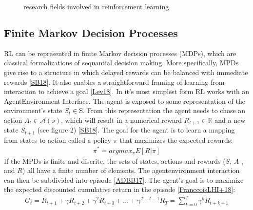 \documentclass[letterpaper,10pt,english]{jupyterBook}
\let\sphinxpxdimen\pdfpxdimen\else\newdimen\sphinxpxdimen
\begin{document}
\begin{figure}[htbp]
\centering
\capstart

\noindent\sphinxincludegraphics[width=600\sphinxpxdimen,height=250\sphinxpxdimen]{{tree}.png}
\caption{research fields involved in reinforcement learning}\label{\detokenize{Reinforcement_learning:tree-fig}}\end{figure}


\subsection{Finite Markov Decision Processes}
\label{\detokenize{Reinforcement_learning:finite-markov-decision-processes}}
\sphinxAtStartPar
RL can be represented in finite Markov decision processes (MDPs), which are classical formalizations of sequantial decision making. More specifically, MPDs give rise to a structure in which delayed rewards can be balanced with immediate rewards {[}\hyperlink{cite.Financial_application:id70}{SB18}{]}. It also enables a straightforward framing of learning from interaction to achieve a goal {[}\hyperlink{cite.Financial_application:id60}{Lev18}{]}. In it’s most simplest form RL works with an Agent\sphinxhyphen{}Environment Interface. The agent is exposed to some representation of the environment’s state \(S_t \in \mathrm{S}\). From this representation the agent needs to chose an action \( A_t \in \mathcal{A}(s)\), which will result in a numerical reward \(R_{t+1} \in 	\mathbb{R} \) and a new state \(S_{t+1}\) (see figure 2) {[}\hyperlink{cite.Financial_application:id70}{SB18}{]}. The goal for the agent is to learn a mapping from states to action called a policy \(\pi\) that maximizes the expected rewards:
\begin{equation*}
\begin{split} \pi^* = argmax_{\pi} E[R|\pi] \end{split}
\end{equation*}
\sphinxAtStartPar
If the MPDs is finite and discrite, the sets of states, actions and rewards (\(S\), \(A\) , and \(R\)) all have a finite number of elements. The agent\sphinxhyphen{}environment interaction can then be subdivided into episode {[}\hyperlink{cite.Financial_application:id63}{ADBB17}{]}.  The agent’s goal is to maximize the expected discounted cumulative return in the episode {[}\hyperlink{cite.Financial_application:id72}{FranccoisLHI+18}{]}:
\begin{equation*}
\begin{split} G_t = R_{t+1} + \gamma R_{t+2} + \gamma^2 R_{t+3} + ... + \gamma^{T-t-1}R_T = \sum_{k=0}^T \gamma^k R_{t+k+1}\end{split}
\end{equation*}
\end{document}
